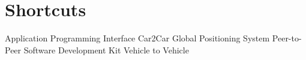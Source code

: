 \chapter*{Shortcuts}
\begin{acronym}[FHWN;-)]
 {Application Programming Interface}
 {Car2Car}
 {Global Positioning System}
 {Peer-to-Peer}
 {Software Development Kit}
 {Vehicle to Vehicle}
\end{acronym}
